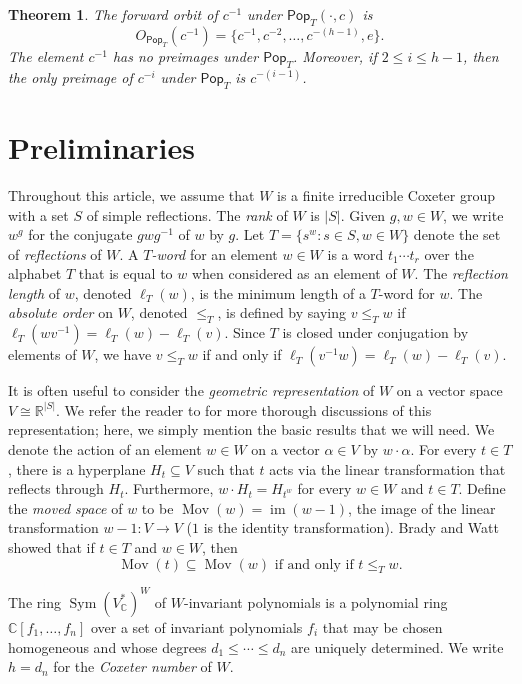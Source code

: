 \documentclass[10pt,a4paper]{amsart}
\newtheorem{theorem}{Theorem}[section]
\theoremstyle{definition}
\newcommand{\darkblue}{\color{darkblue}}
\newcommand{\defn}[1]{\emph{\darkblue #1}}
\newcommand{\pop}{\mathsf{Pop}}
\DeclareMathOperator{\mov}{Mov}
\DeclareMathOperator{\im}{im}
\DeclareMathOperator{\Sym}{Sym}
\begin{document}
\begin{theorem}
\label{thm:cinverseorbit}
The forward orbit of $c^{-1}$ under $\pop_T(\cdot,c)$ is 
\[
O_{\pop_T}(c^{-1})=\{c^{-1}, c^{-2},\ldots, c^{-(h-1)}, e\}.
\]
 The element $c^{-1}$ has no preimages under $\pop_T$. Moreover, if $2\leq i\leq h-1$, then the only preimage of $c^{-i}$ under $\pop_T$ is $c^{-(i-1)}$. 
\end{theorem}

\section{Preliminaries}
Throughout this article, we assume that $W$ is a finite irreducible Coxeter group with a set $S$ of simple reflections. The \defn{rank} of $W$ is $|S|$. Given $g,w\in W$, we write $w^g$ for the conjugate $gwg^{-1}$ of $w$ by $g$. Let $T=\{s^w:s\in S, w\in W\}$ denote the set of \defn{reflections} of $W$. A \defn{$T$-word} for an element $w\in W$ is a word $t_1\cdots t_r$ over the alphabet $T$ that is equal to $w$ when considered as an element of $W$. The \defn{reflection length} of $w$, denoted $\ell_T(w)$, is the minimum length of a $T$-word for $w$. The \defn{absolute order} on $W$, denoted $\leq_T$, is defined by saying $v\leq_T w$ if $\ell_T(wv^{-1})=\ell_T(w)-\ell_T(v)$. Since $T$ is closed under conjugation by elements of $W$, we have $v\leq_T w$ if and only if $\ell_T(v^{-1}w)=\ell_T(w)-\ell_T(v)$. 

It is often useful to consider the \defn{geometric representation} of $W$ on a vector space $V\cong\mathbb R^{|S|}$. We refer the reader to \cite{armstrong2009generalized, BjornerBrenti} for more thorough discussions of this representation; here, we simply mention the basic results that we will need. We denote the action of an element $w\in W$ on a vector $\alpha\in V$ by $w\cdot\alpha$. For every $t\in T$, there is a hyperplane $H_t\subseteq V$ such that $t$ acts via the linear transformation that reflects through $H_t$. Furthermore, $w\cdot H_t=H_{t^w}$ for every $w\in W$ and $t\in T$. Define the \defn{moved space} of $w$ to be $\mov(w)=\im(w-1)$, the image of the linear transformation $w-1:V\to V$ ($1$ is the identity transformation). Brady and Watt \cite{BradyWatt} showed that if $t\in T$ and $w\in W$, then \begin{equation}\label{EqBradyWatt}
\mov(t)\subseteq\mov(w)\text{ if and only if }t\leq _T w.
\end{equation}

The ring $\Sym(V_\mathbb{C}^*)^W$ of $W$-invariant polynomials is a polynomial ring $\mathbb{C}[f_1,\ldots,f_n]$ over a set of invariant polynomials $f_i$ that may be chosen homogeneous and whose degrees $d_1 \leq \cdots \leq d_n$ are uniquely determined.  We write $h=d_n$ for the \defn{Coxeter number} of $W$.
\end{document}

